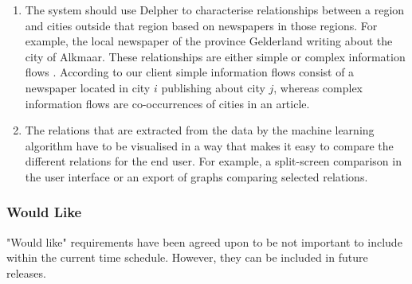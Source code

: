 \begin{enumerate}
    \item The system should use Delpher to characterise relationships between a region and cities outside that region based on newspapers in those regions. For example, the local newspaper of the province Gelderland writing about the city of Alkmaar. These relationships are either simple or complex information flows . According to our client simple information flows consist of a newspaper located in city $i$ publishing about city $j$, whereas complex information flows are co-occurrences of cities in an article.
    \item The relations that are extracted from the data by the machine learning algorithm have to be visualised in a way that makes it easy to compare the different relations for the end user. For example, a split-screen comparison in the user interface or an export of graphs comparing selected relations.
\end{enumerate}
\iffalse
\begin{enumerate}
    \item The application could be able to use international names.
    \item A front-end should be build for the UrbanSearch system. This front-end should visualise basic relations and statistics and can be used for presentations or educational purposes
    \item The software should use Delpher to characterise relationships between a region and cities outside that region based on newspapers in those regions, aggregated over the past 50 years. These relationships are either simple or complex information flows. Simple information flows consist of a newspaper located in city i publishing about city j, whereas complex information flows are co-occurrences of cities in an article.
    \item The relations that are extracted from the data by the machine learning algorithm and the relations provided by the CBS have to be visualised in a way that makes it easy to compare the different relations for the end user.
\end{enumerate}
\fi
\subsubsection {Would Like}
"Would like" requirements have been agreed upon to be not important to include within the current time schedule. However, they can be included in future releases.

